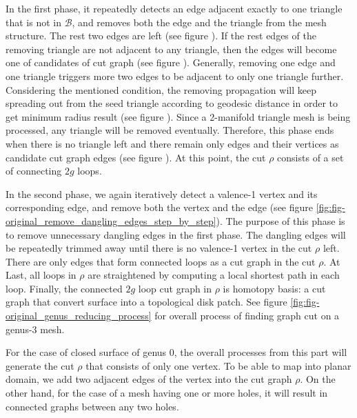 \documentclass[a4paper,twoside]{article}
\begin{document}
In the first phase, it repeatedly detects an edge adjacent exactly to one triangle that is not in $\mathscr{B}$, and removes both the edge and the triangle from the mesh structure. The rest two edges are left (see figure ). If the rest edges of the removing triangle are not adjacent to any triangle, then the edges will become one of candidates of cut graph (see figure ). Generally, removing one edge and one triangle triggers more two edges to be adjacent to only one triangle further. Considering the mentioned condition, the removing propagation will keep spreading out from the seed triangle according to geodesic distance in order to get minimum radius result (see figure ). Since a 2-manifold triangle mesh is being processed, any triangle will be removed eventually. Therefore, this phase ends when there is no triangle left and there remain only edges and their vertices as candidate cut graph edges (see figure ). At this point, the cut $\rho$ consists of a set of connecting $2g$ loops.

In the second phase, we again iteratively detect a valence-1 vertex and its corresponding edge, and remove both the vertex and the edge (see figure \ref{fig:fig-original_remove_dangling_edges_step_by_step}). The purpose of this phase is to remove unnecessary dangling edges in the first phase. The dangling edges will be repeatedly trimmed away until there is no valence-1 vertex in the cut $\rho$ left. There are only edges that form connected loops as a cut graph in the cut $\rho$. At Last, all loops in $\rho$ are straightened by computing a local shortest path in each loop. Finally, the connected $2g$ loop cut graph in $\rho$ is homotopy basis: a cut graph that convert surface into a topological disk patch. See figure \ref{fig:fig-original_genus_reducing_process} for overall process of finding graph cut on a genus-3 mesh.



For the case of closed surface of genus 0, the overall processes from this part will generate the cut $\rho$ that consists of only one vertex. To be able to map into planar domain, we add two adjacent edges of the vertex into the cut graph $\rho$. On the other hand, for the case of a mesh having one or more holes, it will result in connected graphs between any two holes.
\end{document}
